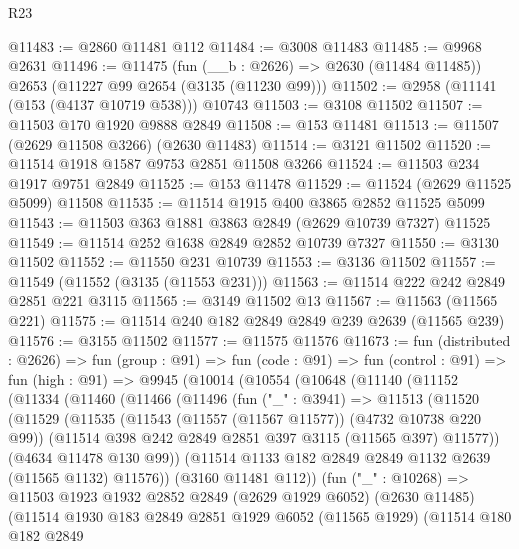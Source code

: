 \begin{lexlean}{R23}
\begin{coremodule}
@11483 := @2860 @11481 @112
@11484 := @3008 @11483
@11485 := @9968 @2631
@11496 := @11475
    (fun (__b : @2626) => @2630 (@11484 @11485))
    @2653
    (@11227 @99 @2654 (@3135 (@11230 @99)))
@11502 := @2958 (@11141 (@153 (@4137 @10719 @538))) @10743
@11503 := @3108 @11502
@11507 := @11503 @170 @1920 @9888 @2849
@11508 := @153 @11481
@11513 := @11507 (@2629 @11508 @3266) (@2630 @11483)
@11514 := @3121 @11502
@11520 := @11514 @1918 @1587 @9753 @2851 @11508 @3266
@11524 := @11503 @234 @1917 @9751 @2849
@11525 := @153 @11478
@11529 := @11524 (@2629 @11525 @5099) @11508
@11535 := @11514 @1915 @400 @3865 @2852 @11525 @5099
@11543 := @11503 @363 @1881 @3863 @2849 (@2629 @10739 @7327) @11525
@11549 := @11514 @252 @1638 @2849 @2852 @10739 @7327
@11550 := @3130 @11502
@11552 := @11550 @231 @10739
@11553 := @3136 @11502
@11557 := @11549 (@11552 (@3135 (@11553 @231)))
@11563 := @11514 @222 @242 @2849 @2851 @221 @3115
@11565 := @3149 @11502 @13
@11567 := @11563 (@11565 @221)
@11575 := @11514 @240 @182 @2849 @2849 @239 @2639 (@11565 @239)
@11576 := @3155 @11502
@11577 := @11575 @11576
@11673 := fun (distributed : @2626) =>
  fun (group : @91) =>
  fun (code : @91) =>
  fun (control : @91) =>
  fun (high : @91) =>
  @9945
    (@10014
      (@10554
        (@10648
          (@11140
            (@11152
              (@11334
                (@11460
                  (@11466
                    (@11496
                      (fun ("_" : @3941) =>
                      @11513
                        (@11520
                          (@11529
                            (@11535
                              (@11543 (@11557 (@11567 @11577)) (@4732 @10738 @220 @99))
                              (@11514 @398 @242 @2849 @2851 @397 @3115 (@11565 @397) @11577))
                            (@4634 @11478 @130 @99))
                          (@11514 @1133 @182 @2849 @2849 @1132 @2639 (@11565 @1132) @11576))
                        (@3160 @11481 @112))
                      (fun ("_" : @10268) =>
                      @11503
                        @1923
                        @1932
                        @2852
                        @2849
                        (@2629 @1929 @6052)
                        (@2630 @11485)
                        (@11514
                          @1930
                          @183
                          @2849
                          @2851
                          @1929
                          @6052
                          (@11565 @1929)
                          (@11514
                            @180
                            @182
                            @2849

\end{coremodule}
\end{lexlean}
